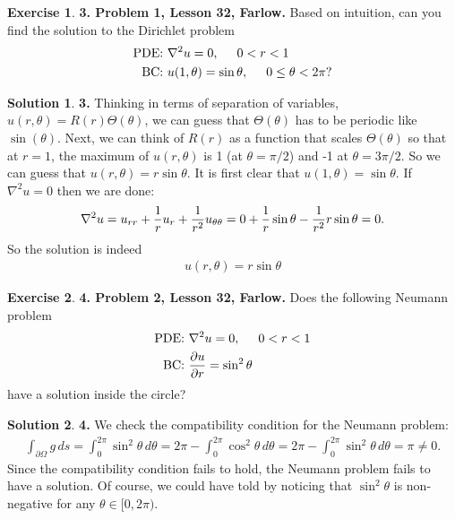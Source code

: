 \documentclass{article}
\theoremstyle{definition}
\newtheorem*{exer*}{Exercise}
\newtheorem*{sln*}{Solution}
\newcommand{\p}{\partial}
\newcommand{\f}[2]{\frac{#1}{#2}}
\begin{document}
\begin{exer*}\textbf{3. Problem 1, Lesson 32, Farlow.} Based on intuition, can you find the solution to the Dirichlet problem 
	\begin{align*}
	\text{PDE: } &\laplacian u = 0, \hspace{0.5cm} 0 < r < 1\\
	\text{BC: }  &u(1,\theta) = \sin\theta, \hspace{0.5cm} 0 \leq \theta < 2\pi? 
	\end{align*}
	
	\begin{sln*}\textbf{3. }
		Thinking in terms of separation of variables, $u(r,\theta) = R(r)\Theta(\theta)$, we can guess that $\Theta(\theta)$ has to be periodic like $\sin(\theta)$. Next, we can think of $R(r)$ as a function that scales $\Theta(\theta)$ so that at $r = 1$, the maximum of $u(r,\theta)$ is 1 (at $\theta = \pi/2$) and -1 at $\theta = 3\pi/2$. So we can guess that $u(r,\theta) = r\sin\theta$. It is first clear that $u(1,\theta) = \sin\theta$. If $\nabla^2 u = 0 $ then we are done:
		\begin{align*}
		\laplacian u = u_{rr} + \f{1}{r}u_r + \f{1}{r^2}u_{\theta\theta}= 0 + \f{1}{r}\sin\theta - \f{1}{r^2}r\sin\theta = 0.
		\end{align*}
		So the solution is indeed
		\begin{align*}
		\boxed{u(r,\theta) = r\sin\theta}
		\end{align*}
	\end{sln*}
\end{exer*}




\newpage

\begin{exer*}\textbf{4. Problem 2, Lesson 32, Farlow.} Does the following Neumann problem
	\begin{align*}
	\text{PDE: } &\laplacian u = 0, \hspace{0.5cm} 0 < r < 1\\
	\text{BC: } &\f{\p u}{\p r} = \sin^2\theta
	\end{align*}
have a solution inside the circle?
	
	\begin{sln*}\textbf{4. }
		We check the compatibility condition for the Neumann problem:
		\begin{align*}
		\int_{\p \Omega} g\,ds = \int^{2\pi}_0 \sin^2\theta \, d\theta = 2\pi - \int^{2\pi}_0\cos^2\theta\,d\theta = 2\pi - \int^{2\pi}_0 \sin^2\theta\,d\theta = \pi \neq 0.
		\end{align*}
		Since the compatibility condition fails to hold, the Neumann problem fails to have a solution. Of course, we could have told by noticing that $\sin^2\theta$ is non-negative for any $\theta \in [0,2\pi)$. 
	\end{sln*}
\end{exer*}
\end{document}
